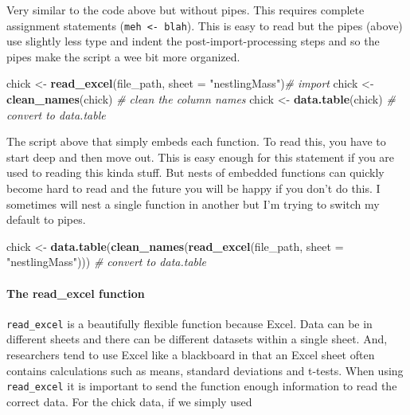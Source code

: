\documentclass[]{book}
\newenvironment{Shaded}{\begin{snugshade}}{\end{snugshade}}
\newcommand{\CommentTok}[1]{\textcolor[rgb]{0.56,0.35,0.01}{\textit{#1}}}
\newcommand{\DataTypeTok}[1]{\textcolor[rgb]{0.13,0.29,0.53}{#1}}
\newcommand{\KeywordTok}[1]{\textcolor[rgb]{0.13,0.29,0.53}{\textbf{#1}}}
\newcommand{\NormalTok}[1]{#1}
\newcommand{\StringTok}[1]{\textcolor[rgb]{0.31,0.60,0.02}{#1}}
\let\oldparagraph\paragraph
\renewcommand{\paragraph}[1]{\oldparagraph{#1}\mbox{}}
\begin{document}
Very similar to the code above but without pipes. This requires complete assignment statements (\texttt{meh\ \textless{}-\ blah}). This is easy to read but the pipes (above) use slightly less type and indent the post-import-processing steps and so the pipes make the script a wee bit more organized.

\begin{Shaded}
\begin{Highlighting}[]
\NormalTok{chick <-}\StringTok{ }\KeywordTok{read_excel}\NormalTok{(file_path, }
                    \DataTypeTok{sheet =} \StringTok{"nestlingMass"}\NormalTok{)}\CommentTok{# import}
\NormalTok{chick <-}\StringTok{ }\KeywordTok{clean_names}\NormalTok{(chick) }\CommentTok{# clean the column names}
\NormalTok{chick <-}\StringTok{ }\KeywordTok{data.table}\NormalTok{(chick) }\CommentTok{# convert to data.table}
\end{Highlighting}
\end{Shaded}

The script above that simply embeds each function. To read this, you have to start deep and then move out. This is easy enough for this statement if you are used to reading this kinda stuff. But nests of embedded functions can quickly become hard to read and the future you will be happy if you don't do this. I sometimes will nest a single function in another but I'm trying to switch my default to pipes.

\begin{Shaded}
\begin{Highlighting}[]
\NormalTok{chick <-}\StringTok{ }\KeywordTok{data.table}\NormalTok{(}\KeywordTok{clean_names}\NormalTok{(}\KeywordTok{read_excel}\NormalTok{(file_path, }
                    \DataTypeTok{sheet =} \StringTok{"nestlingMass"}\NormalTok{))) }\CommentTok{# convert to data.table}
\end{Highlighting}
\end{Shaded}

\hypertarget{the-read_excel-function}{%
\paragraph{The read\_excel function}\label{the-read_excel-function}}

\texttt{read\_excel} is a beautifully flexible function because Excel. Data can be in different sheets and there can be different datasets within a single sheet. And, researchers tend to use Excel like a blackboard in that an Excel sheet often contains calculations such as means, standard deviations and t-tests. When using \texttt{read\_excel} it is important to send the function enough information to read the correct data. For the chick data, if we simply used
\end{document}
